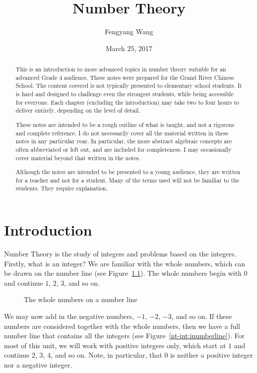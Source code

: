 \documentclass[a4paper,10pt]{report}
\title{Number Theory}
\author{Fengyang Wang}
\date{March 25, 2017}
\begin{document}
\begin{abstract}

This is an introduction to more advanced topics in number theory suitable for
an advanced Grade 4 audience. These notes were prepared for the Grand River
Chinese School. The content covered is not typically presented to elementary
school students. It is hard and designed to challenge even the strongest
students, while being accessible for everyone. Each chapter (excluding the
introduction) may take two to four hours to deliver entirely, depending on the
level of detail.

These notes are intended to be a rough outline of what is taught, and not a
rigorous and complete reference. I do not necessarily cover all the material
written in these notes in any particular year. In particular, the more abstract
algebraic concepts are often abbreviated or left out, and are included for
completeness. I may occasionally cover material beyond that written in the
notes.

Although the notes are intended to be presented to a young audience, they are
written for a teacher and not for a student. Many of the terms used will not be
familiar to the students. They require explanation.

\end{abstract}

\maketitle

\tableofcontents

\chapter{Introduction}

Number Theory is the study of \glspl{integer} and problems based on the
integers. Firstly, what is an integer? We are familiar with the whole numbers,
which can be drawn on the number line (see Figure~\ref{nt-int:pnumberline}).
The whole numbers begin with \(0\) and continue \(1\), \(2\), \(3\), and so on.

\begin{figure}

 \caption{The whole numbers on a number line}
 \label{nt-int:pnumberline}
\end{figure}

We may now add in the negative numbers, \(-1\), \(-2\), \(-3\), and so on. If
these numbers are considered together with the whole numbers, then we have a
full number line that contains all the integers (see
Figure~\ref{nt-int:inumberline}). For most of this unit, we will work with
positive integers only, which start at \(1\) and continue \(2\), \(3\), \(4\),
and so on. Note, in particular, that \(0\) is neither a positive integer nor a
negative integer.
\end{document}
